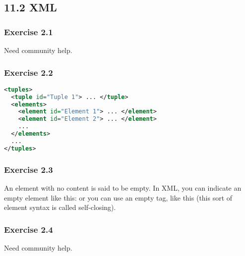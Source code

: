 \documentclass[../../main.tex]{subfiles}
\begin{document}
\subsection{11.2 XML}

\subsubsection*{Exercise 2.1}

Need community help.

\subsubsection*{Exercise 2.2}

\begin{lstlisting}[language=xml]
<tuples>
  <tuple id="Tuple 1"> ... </tuple>
  <elements>
    <element id="Element 1"> ... </element>
    <element id="Element 2"> ... </element>
    ...
  </elements>
  ...
</tuples>
\end{lstlisting}

\subsubsection*{Exercise 2.3}

An element with no content is said to be empty. In XML, you can indicate
an empty element like this: or you can use an empty tag, like this
(this sort of element syntax is called self-closing).

\subsubsection*{Exercise 2.4}

Need community help.
\end{document}
